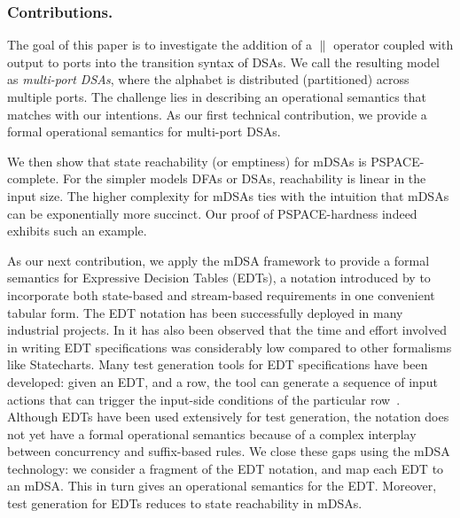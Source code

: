   \subsubsection*{Contributions.} The goal of this paper is to investigate the
  addition of a $\parallel$ operator coupled with output to ports into the
  transition syntax of DSAs. We call the resulting model as \emph{multi-port
  DSAs}, where the alphabet is distributed (partitioned) across multiple ports.
  The challenge lies in describing an operational semantics that matches with
  our intentions. As our first technical contribution, we provide a formal
  operational semantics for multi-port DSAs. 
  
  We then show that state reachability (or emptiness) for mDSAs is PSPACE-complete. For the simpler models DFAs or DSAs, reachability is linear in the input size. The higher complexity for mDSAs ties with the intuition that mDSAs can be exponentially more succinct. Our proof of PSPACE-hardness indeed exhibits such an example. 

  As our next contribution, we apply the mDSA framework to provide a formal semantics for Expressive Decision Tables (EDTs), a notation introduced by \cite{DBLP:conf/date/VenkateshSKA14} to incorporate both state-based and stream-based requirements in one convenient tabular form. The EDT notation has been successfully deployed in many industrial projects. In \cite{DBLP:conf/date/VenkateshSKA14} it has also been observed that the time and effort involved in writing EDT specifications was considerably low compared to other formalisms like  Statecharts. Many test generation tools for EDT specifications have been developed: given an EDT, and a row, the tool can generate a sequence of input actions that can trigger the input-side conditions of the particular row~\cite{DBLP:conf/enase/VenkateshSZA15a,DBLP:conf/icst/AgrawalVSZV20}. %
  Although EDTs have been used extensively for test generation, the notation does not yet have a formal operational semantics because of a complex interplay between concurrency and suffix-based rules. We close these gaps using the mDSA technology: we consider a fragment of the EDT notation, and map each EDT to an mDSA. This in turn gives an operational semantics for the EDT. Moreover, test generation for EDTs reduces to state reachability in mDSAs. 
  
  
  
  


